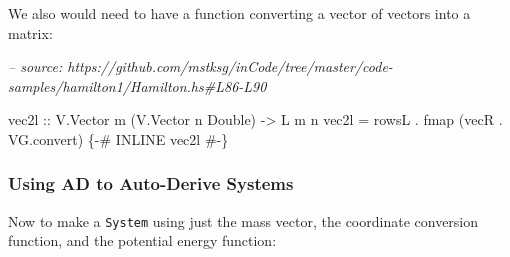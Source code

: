 \documentclass[]{article}
\newenvironment{Shaded}{}{}
\newcommand{\CommentTok}[1]{\textcolor[rgb]{0.38,0.63,0.69}{\textit{#1}}}
\newcommand{\DataTypeTok}[1]{\textcolor[rgb]{0.56,0.13,0.00}{#1}}
\newcommand{\FunctionTok}[1]{\textcolor[rgb]{0.02,0.16,0.49}{#1}}
\newcommand{\NormalTok}[1]{#1}
\newcommand{\OtherTok}[1]{\textcolor[rgb]{0.00,0.44,0.13}{#1}}
\begin{document}
We also would need to have a function converting a vector of vectors into a
matrix:

\begin{Shaded}
\begin{Highlighting}[]
\CommentTok{-- source: https://github.com/mstksg/inCode/tree/master/code-samples/hamilton1/Hamilton.hs#L86-L90}

\NormalTok{vec2l}
\OtherTok{    ::} \DataTypeTok{V.Vector}\NormalTok{ m (}\DataTypeTok{V.Vector}\NormalTok{ n }\DataTypeTok{Double}\NormalTok{)}
    \OtherTok{->} \DataTypeTok{L}\NormalTok{ m n}
\NormalTok{vec2l }\FunctionTok{=}\NormalTok{ rowsL }\FunctionTok{.}\NormalTok{ fmap (vecR }\FunctionTok{.}\NormalTok{ VG.convert)}
\OtherTok{\{-# INLINE vec2l #-\}}
\end{Highlighting}
\end{Shaded}

\hypertarget{using-ad-to-auto-derive-systems}{%
\subsubsection{Using AD to Auto-Derive
Systems}\label{using-ad-to-auto-derive-systems}}

Now to make a \texttt{System} using just the mass vector, the coordinate
conversion function, and the potential energy function:
\end{document}

